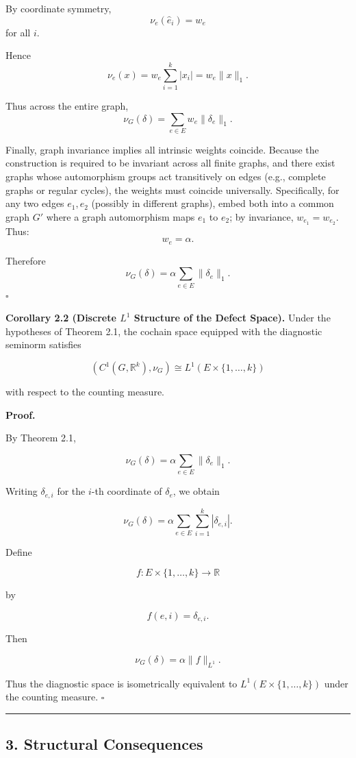 \documentclass[
]{article}
\begin{document}
By coordinate symmetry, \[ \nu_e(\hat{e}_i)=w_e \] for all \(i\).

Hence \[ \nu_e(x)=w_e\sum_{i=1}^k |x_i|=w_e\|x\|_1. \]

Thus across the entire graph,
\[ \nu_G(\delta)=\sum_{e\in E} w_e\|\delta_e\|_1. \]

Finally, graph invariance implies all intrinsic weights coincide.
Because the construction is required to be invariant across all finite
graphs, and there exist graphs whose automorphism groups act
transitively on edges (e.g., complete graphs or regular cycles), the
weights must coincide universally. Specifically, for any two edges
\(e_1, e_2\) (possibly in different graphs), embed both into a common
graph \(G'\) where a graph automorphism maps \(e_1\) to \(e_2\); by
invariance, \(w_{e_1} = w_{e_2}\). Thus: \[ w_e=\alpha. \]

Therefore \[ \nu_G(\delta)=\alpha\sum_{e\in E}\|\delta_e\|_1. \]
\(\square\)

\textbf{Corollary 2.2 (Discrete \(L^1\) Structure of the Defect Space).}
Under the hypotheses of Theorem 2.1, the cochain space equipped with the
diagnostic seminorm satisfies

\[
(C^1(G,\mathbb{R}^k),\nu_G)
\cong
L^1(E\times\{1,\dots,k\})
\]

with respect to the counting measure.

\textbf{Proof.}

By Theorem 2.1,

\[
\nu_G(\delta)
=
\alpha\sum_{e\in E}\|\delta_e\|_1.
\]

Writing \(\delta_{e,i}\) for the \(i\)-th coordinate of \(\delta_e\), we
obtain

\[
\nu_G(\delta)
=
\alpha\sum_{e\in E}\sum_{i=1}^k |\delta_{e,i}|.
\]

Define

\[
f:E\times\{1,\dots,k\}\to\mathbb{R}
\]

by

\[
f(e,i)=\delta_{e,i}.
\]

Then

\[
\nu_G(\delta)
=
\alpha\|f\|_{L^1}.
\]

Thus the diagnostic space is isometrically equivalent to
\(L^1(E\times\{1,\dots,k\})\) under the counting measure. \(\square\)

\begin{center}\rule{0.5\linewidth}{0.5pt}\end{center}

\subsection{3. Structural Consequences}\label{structural-consequences}
\end{document}
